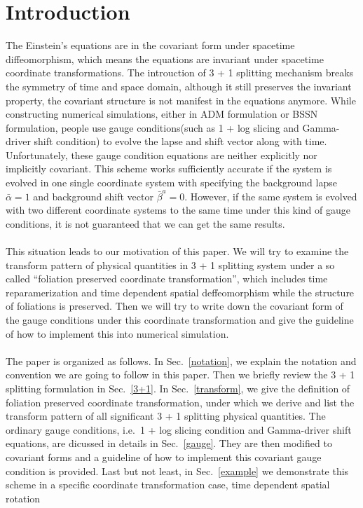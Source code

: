\documentclass[letterpaper,nofootinbib,prd,amsmath,onecolumn]{revtex4-1}
\begin{document}
\section{Introduction}
The Einstein's equations are in the covariant form under spacetime diffeomorphism, which means the equations are invariant under spacetime coordinate transformations. The introuction of 3 + 1 splitting mechanism breaks the symmetry of time and space domain, although it still preserves the invariant property, the covariant structure is not manifest in the equations anymore. While constructing numerical simulations, either in ADM formulation or BSSN formulation, people use gauge conditions(such as 1 + log slicing and Gamma-driver shift condition) to evolve the lapse and shift vector along with time. Unfortunately, these gauge condition equations are neither explicitly nor implicitly covariant. This scheme works sufficiently accurate if the system is evolved in one single coordinate system with specifying the background lapse ${\bar \alpha} = 1$ and background shift vector ${\bar \beta}^{a} = 0$. However, if the same system is evolved with two different coordinate systems to the same time under this kind of gauge conditions, it is not guaranteed that we can get the same results. \\
\\
This situation leads to our motivation of this paper. We will try to examine the transform pattern of physical quantities in 3 + 1 splitting system under a so called ``foliation preserved coordinate transformation'', which includes time reparamerization and time dependent spatial deffeomorphism while the structure of foliations is preserved. Then we will try to write down the covariant form of the gauge conditions under this coordinate transformation and give the guideline of how to implement this into numerical simulation. 
\\
\\
The paper is organized as follows. In Sec.~\ref{notation}, we explain the notation and convention we are going to follow in this paper. Then we briefly review the 3 + 1 splitting formulation in Sec.~\ref{3+1}. In Sec.~\ref{transform}, we give the definition of foliation preserved coordinate transformation, under which we derive and list the transform pattern of all significant 3 + 1 splitting physical quantities. The ordinary gauge conditions, i.e.~1 + log slicing condition and Gamma-driver shift equations, are dicussed in details in Sec.~\ref{gauge}. They are then modified to covariant forms and a guideline of how to implement this covariant gauge condition is provided. Last but not least, in Sec.~\ref{example} we demonstrate this scheme in a specific coordinate transformation case, time dependent spatial rotation
\end{document}
